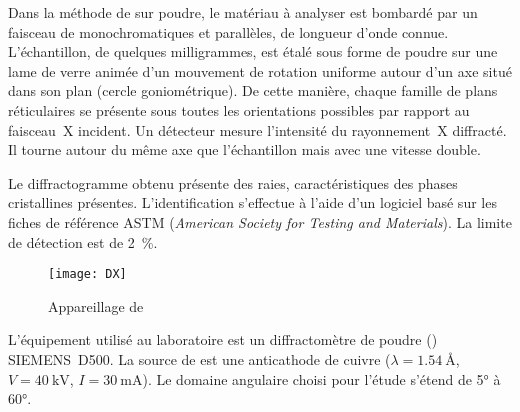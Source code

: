 Dans la méthode de \DX sur poudre, le matériau à analyser est bombardé par un faisceau de \RX monochromatiques et parallèles, de longueur d'onde connue. L'échantillon, de quelques milligrammes, est étalé sous forme de poudre sur une lame de verre animée d'un mouvement de rotation uniforme autour d'un axe situé dans son plan (cercle goniométrique). De cette manière, chaque famille de plans réticulaires se présente sous toutes les orientations possibles par rapport au faisceau~X incident. Un détecteur mesure l'intensité du rayonnement~X diffracté. Il tourne autour du même axe que l'échantillon mais avec une vitesse double.

Le diffractogramme obtenu présente des raies, caractéristiques des 
phases cristallines présentes. L'identification s'effectue à l'aide 
d'un logiciel basé sur les fiches de référence ASTM (\emph{American 
Society for Testing and Materials}). La limite de détection est de 
\SI{2}{\percent}.

\begin{figure}[htb]
  \texttt{[image: DX]}
  \caption{Appareillage de \DX}
  \label{fig:DX}
\end{figure}

L'équipement utilisé au laboratoire est un diffractomètre de 
poudre () SIEMENS~D500. La source de \RX est une 
anticathode de cuivre ($\lambda=\SI{1.54}{\angstrom}$, 
$V=\SI{40}{\kV}$, $I=\SI{30}{\mA}$). Le domaine angulaire choisi 
pour l'étude s'étend de \ang{5} à \ang{60}.
